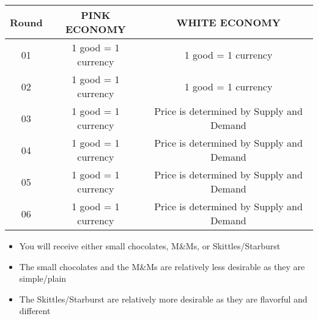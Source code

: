 \documentclass[12pt]{article}
\begin{document}
\begin{table}[ht]
    \selectfont
    \centering
    \begin{tabular}{c|c|c}
    \toprule
        \textbf{Round} & \textbf{PINK ECONOMY} & \textbf{WHITE ECONOMY} \\
        \midrule
        01 & 1 good = 1 currency & 1 good = 1 currency \\
        \midrule
        02 & 1 good = 1 currency & 1 good = 1 currency \\
        \midrule 
        03 & 1 good = 1 currency & Price is determined by Supply and Demand \\
        \midrule 
        04 & 1 good = 1 currency & Price is determined by Supply and Demand \\
        \midrule 
        05 & 1 good = 1 currency & Price is determined by Supply and Demand \\
        \midrule 
        06 & 1 good = 1 currency & Price is determined by Supply and Demand \\
    \bottomrule 
    \end{tabular}
\end{table}

\begin{itemize}
    \item You will receive either small chocolates, M\&Ms, or Skittles/Starburst
    \item The small chocolates and the M\&Ms are relatively less desirable as they are simple/plain
    \item The Skittles/Starburst are relatively more desirable as they are flavorful and different
\end{itemize}
\end{document}
